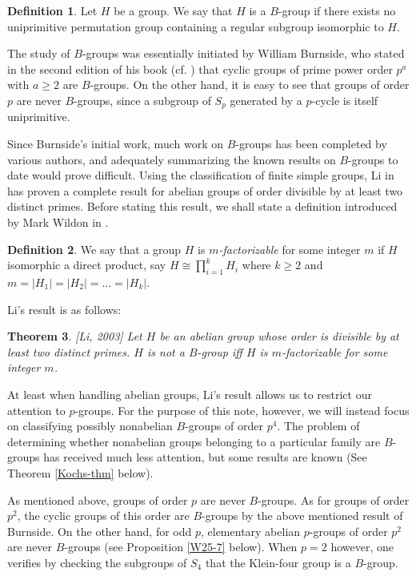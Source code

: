\documentclass[12pt]{amsart}
\newtheorem{theorem}{Theorem}[section]
\theoremstyle{definition}
\newtheorem{definition}[theorem]{Definition}
\begin{document}
	\begin{definition}
		Let $H$ be a group. We say that $H$ is a $B$-group if there exists no uniprimitive permutation group containing a regular subgroup isomorphic to $H$.
	\end{definition} 
	The study of $B$-groups was essentially initiated by William Burnside, who stated in the second edition of his book (cf. \cite[\S252]{Burn}) that cyclic groups of prime power order $p^a$ with $a \geq 2$ are $B$-groups. On the other hand, it is easy to see that groups of order $p$ are never $B$-groups, since a subgroup of $S_p$ generated by a $p$-cycle is itself uniprimitive.
	
	Since Burnside's initial work, much work on $B$-groups has been completed by various authors, and adequately summarizing the known results on $B$-groups to date would prove difficult. Using the classification of finite simple groups, Li in \cite[Corollary 1.3]{Li} has proven a complete result for abelian groups of order divisible by at least two distinct primes. Before stating this result, we shall state a definition introduced by Mark Wildon in \cite{Wild2}. 
	
	\begin{definition}
		We say that a group $H$ is $m$\emph{-factorizable} for some integer $m$ if $H$ isomorphic a direct product, say $H \cong \prod_{i=1}^k H_i$ where $k \geq 2$ and $m = |H_1| = |H_2| = \ldots = |H_k|$.
	\end{definition}
	Li's result is as follows:
	\begin{theorem}\label{Li-Corollary}[Li, 2003]
		Let $H$ be an abelian group whose order is divisible by at least two distinct primes. $H$ is not a $B$-group iff $H$ is $m$-factorizable for some integer $m$.
	\end{theorem} 
	
	

	At least when handling abelian groups, Li's result allows us to restrict our attention to $p$-groups. For the purpose of this note, however, we will instead focus on classifying possibly nonabelian $B$-groups of order $p^4$. The problem of determining whether nonabelian groups belonging to a particular family are $B$-groups has received much less attention, but some results are known (See Theorem \ref{Kochs-thm} below).
	
	
	As mentioned above, groups of order $p$ are never $B$-groups. As for groups of order $p^2$, the cyclic groups of this order are $B$-groups by the above mentioned result of Burnside. On the other hand, for odd $p$, elementary abelian $p$-groups of order $p^2$ are never $B$-groups (see Proposition \ref{W25-7} below). When $p=2$ however, one verifies by checking the subgroups of $S_4$ that the Klein-four group is a $B$-group.
	
\end{document}
